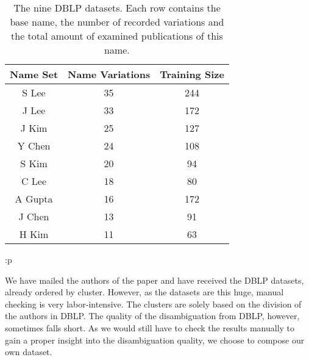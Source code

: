\begin{table}
	\centering
		\begin{tabular}[ht]{|c|c|c|}
			\hline
			\bfseries{Name Set} & \bfseries{Name Variations} & \bfseries{Training Size} \\
			\hline
			S Lee & 35 & 244 \\
			\hline
			J Lee & 33 & 172 \\
			\hline
			J Kim & 25 & 127 \\
			\hline
			Y Chen & 24 & 108 \\
			\hline
			S Kim & 20 & 94 \\
			\hline
			C Lee & 18 & 80 \\
			\hline
			A Gupta & 16 & 172 \\
			\hline
			J Chen & 13 & 91 \\
			\hline
			H Kim & 11 & 63 \\
			\hline
		\end{tabular}:p
	\caption{The nine DBLP datasets. Each row contains the base name, the number of recorded variations and the total amount of examined publications of this name.}
	\label{tab:TheNineDBLPDatasetsOfDifferentNamesAndTheDataSize}
\end{table}

We have mailed the authors of the paper \cite{han2004two} and have received the DBLP datasets, already ordered by cluster. However, as the datasets are this huge, manual checking is very labor-intensive. The clusters are solely based on the division of the authors in DBLP. The quality of the disambiguation from DBLP, however, sometimes falls short. As we would still have to check the results manually to gain a proper insight into the disambiguation quality, we choose to compose our own dataset.

